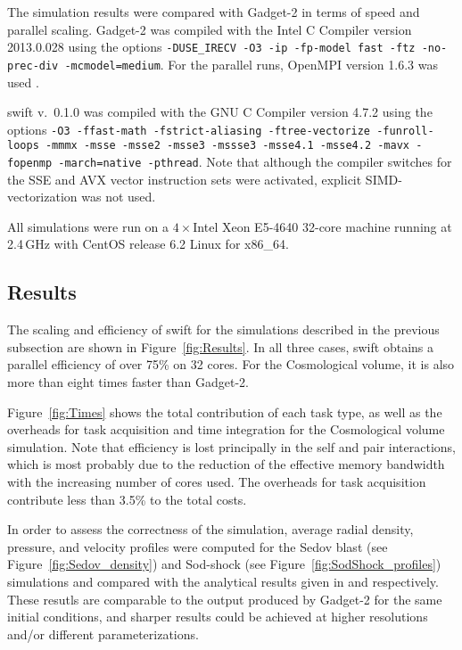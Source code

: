\documentclass[a4paper,conference]{IEEEtran}
\newcommand{\fig}[1]
    {Figure~\ref{fig:#1}}
\newcommand{\swift}
    {{\sc swift}\xspace}
\begin{document}
The simulation results were compared with Gadget-2 \cite{ref:Springel2005}
in terms of speed and parallel scaling.
Gadget-2 was compiled with the Intel C Compiler version 2013.0.028
using the options \texttt{\small -DUSE\_IRECV -O3 -ip -fp-model fast -ftz
-no-prec-div -mcmodel=medium}.
For the parallel runs, OpenMPI version 1.6.3 was used \cite{ref:Gabriel2004}.

\swift v.~0.1.0 was compiled with the GNU C Compiler version 4.7.2
using the options \texttt{\small -O3 -ffast-math -fstrict-aliasing
-ftree-vectorize -funroll-loops -mmmx -msse -msse2 -msse3 -mssse3
-msse4.1 -msse4.2 -mavx -fopenmp -march=native -pthread}.
Note that although the compiler switches for the SSE and AVX
vector instruction sets were activated, explicit
SIMD-vectorization was not used.

All simulations were run on a $4\times$Intel Xeon E5-4640
32-core machine running at 2.4\,GHz with
CentOS release 6.2 Linux for x86\_64.


\subsection{Results}

The scaling and efficiency of \swift for the simulations described
in the previous subsection are shown in \fig{Results}.
In all three cases, \swift obtains a parallel efficiency of over
75\% on 32 cores.
For the Cosmological volume, it is also more than eight times
faster than Gadget-2.

\fig{Times} shows the total contribution of each task type, as well
as the overheads for task acquisition and time integration
for the Cosmological volume simulation.
Note that efficiency is lost principally in the self and pair 
interactions, which is most probably due to the reduction of
the effective memory bandwidth with the increasing number of cores
used.
The overheads for task acquisition contribute less than 3.5\% to
the total costs.

In order to assess the correctness of the simulation, average radial
density, pressure, and velocity profiles were computed for
the Sedov blast (see \fig{Sedov_density}) and Sod-shock
(see \fig{SodShock_profiles}) simulations and compared with
the analytical results given in \cite{ref:Sedov1959} and
\cite{ref:Sod1978} respectively.
These resutls are comparable to the output produced by
Gadget-2 for the same initial conditions, and sharper
results could be achieved at higher resolutions and/or
different parameterizations.
\end{document}

